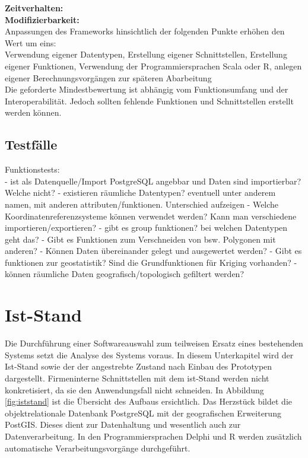 \textbf{Zeitverhalten:}\\


\textbf{Modifizierbarkeit:}\\
Anpassungen des Frameworks hinsichtlich der folgenden Punkte erhöhen den Wert um eins:\\
Verwendung eigener Datentypen, Erstellung eigener Schnittstellen, Erstellung eigener Funktionen, Verwendung der Programmiersprachen Scala oder R, anlegen eigener Berechnungsvorgängen zur späteren Abarbeitung\\
Die geforderte Mindestbewertung ist abhängig vom Funktionsumfang und der Interoperabilität.
Jedoch sollten fehlende Funktionen und Schnittstellen erstellt werden können.

\subsection{Testfälle}

%
Funktionstests:\\
- ist als Datenquelle/Import PostgreSQL angebbar und Daten sind importierbar? Welche nicht?
- existieren räumliche Datentypen? eventuell unter anderem namen, mit anderen attributen/funktionen. Unterschied aufzeigen
- Welche Koordinatenreferenzsysteme können verwendet werden? Kann man verschiedene importieren/exportieren?
- gibt es group funktionen? bei welchen Datentypen geht das?
- Gibt es Funktionen zum Verschneiden von bsw. Polygonen mit anderen?
- Können Daten übereinander gelegt und ausgewertet werden?
- Gibt es funktionen zur geostatistik? Sind die Grundfunktionen für Kriging vorhanden?
- können räumliche Daten geografisch/topologisch gefiltert werden?

\section{Ist-Stand}
\label{IstStand}

Die Durchführung einer Softwareauswahl zum teilweisen Ersatz eines bestehenden Systems setzt die Analyse des Systems voraus.
In diesem Unterkapitel wird der Ist-Stand sowie der der angestrebte Zustand nach Einbau des Prototypen dargestellt.
Firmeninterne Schnittstellen mit dem ist-Stand werden nicht konkretisiert, da sie den Anwendungsfall nicht schneiden.
In Abbildung \ref{fig:iststand} ist die Übersicht des Aufbaus ersichtlich.
Das Herzstück bildet die objektrelationale Datenbank PostgreSQL mit der geografischen Erweiterung PostGIS.
Dieses dient zur Datenhaltung und wesentlich auch zur Datenverarbeitung.
In den Programmiersprachen Delphi und R werden zusätzlich automatische Verarbeitungsvorgänge durchgeführt.

